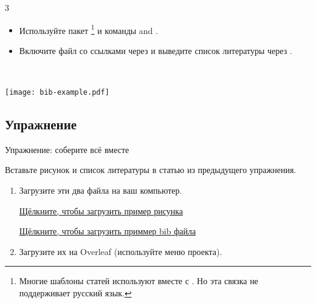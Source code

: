 \documentclass{beamer}
\begin{document}
\begin{frame}[fragile]{\insertsubsection{} 3}
\vspace{-3ex}
\small
\begin{itemize}
\item Используйте пакет \footnote{\scriptsize Многие шаблоны статей используют
 вместе с . Но эта связка не поддерживает русский язык.}
и команды  and .
\item Включите файл со ссылками через  и выведите список
литературы через .
\end{itemize}
\vspace{-2ex}
\begin{minipage}{0.55\linewidth}
\end{minipage}~~%
\begin{minipage}{0.45\linewidth}
\texttt{[image: bib-example.pdf]}
\end{minipage}
\end{frame}

\subsection{Упражнение}
\begin{frame}[fragile]{Упражнение: соберите всё вместе}

Вставьте рисунок и список литературы в статью из предыдущего упражнения.

\begin{enumerate}
\item Загрузите эти два файла на ваш компьютер.
\vspace{1ex}
\begin{printout}
\href{\fileuri/big_chick.png?dl=1}{Щёлкните, чтобы загрузить пример рисунка}
\end{printout}
\begin{printout}
\href{\fileuri/bib-exercise.bib?dl=1}{Щёлкните, чтобы загрузить приммер bib файла}
\end{printout}

\item Загрузите их на Overleaf (используйте меню проекта).

\end{enumerate}
\end{frame}
\end{document}
